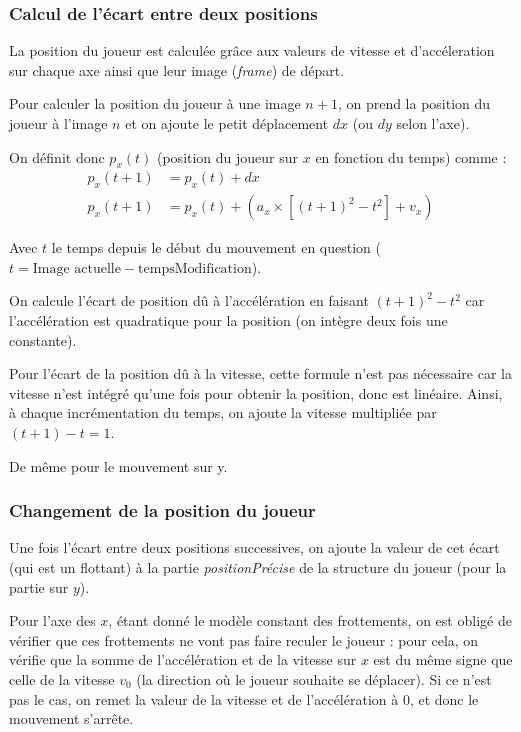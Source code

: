 \documentclass[12pt]{article}
\begin{document}
		\subsubsection{Calcul de l'écart entre deux positions}
		
		La position du joueur est calculée grâce aux valeurs de vitesse et d'accéleration sur chaque axe ainsi que leur image (\textit{frame}) de départ.
		
		Pour calculer la position du joueur à une image \(n + 1\), on prend la position du joueur à l'image \(n\) et on ajoute le petit déplacement \(dx\) (ou \(dy\) selon l'axe).
		
		On définit donc \(p_x(t)\) (position du joueur sur \(x\) en fonction du temps) comme :
		\begin{align*}
			p_x(t+1) &= p_x(t) + dx\\
			p_x(t+1)&= p_x(t) + (a_x \times [(t+1)^2 - t^2] + v_x)
		\end{align*}		
	
		Avec \(t\) le temps depuis le début du mouvement en question (\(t = \text{Image actuelle} - \text{tempsModification}\)).
		
		On calcule l'écart de position dû à l'accélération en faisant \((t+1)^2 - t^2\) car l'accélération est quadratique pour la position (on intègre deux fois une constante).
		
		Pour l'écart de la position dû à la vitesse, cette formule n'est pas nécessaire car la vitesse n'est intégré qu'une fois pour obtenir la position, donc est linéaire. Ainsi, à chaque incrémentation du temps, on ajoute la vitesse multipliée par \((t + 1) - t = 1\).
		
		De même pour le mouvement sur y.
		
		\subsubsection{Changement de la position du joueur}
		
		Une fois l'écart entre deux positions successives, on ajoute la valeur de cet écart (qui est un flottant) à la partie \textit{positionPrécise} de la structure du joueur (pour la partie sur \(y\)).
		
		Pour l'axe des \(x\), étant donné le modèle constant des frottements, on est obligé de vérifier que ces frottements ne vont pas faire reculer le joueur : pour cela, on vérifie que la somme de l'accélération et de la vitesse sur \(x\) est du même signe que celle de la vitesse \(v_0\) (la direction où le joueur souhaite se déplacer). Si ce n'est pas le cas, on remet la valeur de la vitesse et de l'accélération à 0, et donc le mouvement s'arrête.
		
\end{document}
